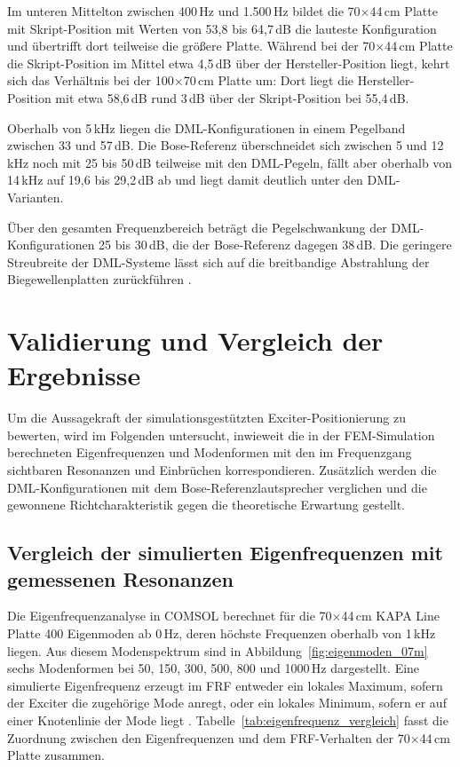 Im unteren Mittelton zwischen 400\,Hz und 1.500\,Hz bildet die 70$\times$44\,cm Platte mit Skript-Position mit Werten von 53,8 bis 64,7\,dB die lauteste Konfiguration und übertrifft dort teilweise die größere Platte. Während bei der 70$\times$44\,cm Platte die Skript-Position im Mittel etwa 4,5\,dB über der Hersteller-Position liegt, kehrt sich das Verhältnis bei der 100$\times$70\,cm Platte um: Dort liegt die Hersteller-Position mit etwa 58,6\,dB rund 3\,dB über der Skript-Position bei 55,4\,dB.

Oberhalb von 5\,kHz liegen die DML-Konfigurationen in einem Pegelband zwischen 33 und 57\,dB. Die Bose-Referenz überschneidet sich zwischen 5 und 12\,kHz noch mit 25 bis 50\,dB teilweise mit den DML-Pegeln, fällt aber oberhalb von 14\,kHz auf 19,6 bis 29,2\,dB ab und liegt damit deutlich unter den DML-Varianten.

Über den gesamten Frequenzbereich beträgt die Pegelschwankung der DML-Konfigurationen 25 bis 30\,dB, die der Bose-Referenz dagegen 38\,dB. Die geringere Streubreite der DML-Systeme lässt sich auf die breitbandige Abstrahlung der Biegewellenplatten zurückführen \cite{Harris2000,Bai2001}.

\clearpage

\section{Validierung und Vergleich der Ergebnisse}

Um die Aussagekraft der simulationsgestützten Exciter-Positionierung zu bewerten, wird im Folgenden untersucht, inwieweit die in der FEM-Simulation berechneten Eigenfrequenzen und Modenformen mit den im Frequenzgang sichtbaren Resonanzen und Einbrüchen korrespondieren. Zusätzlich werden die DML-Konfigurationen mit dem Bose-Referenzlautsprecher verglichen und die gewonnene Richtcharakteristik gegen die theoretische Erwartung gestellt.

\subsection{Vergleich der simulierten Eigenfrequenzen mit gemessenen Resonanzen}

Die Eigenfrequenzanalyse in COMSOL berechnet für die 70$\times$44\,cm KAPA Line Platte 400 Eigenmoden ab 0\,Hz, deren höchste Frequenzen oberhalb von 1\,kHz liegen. Aus diesem Modenspektrum sind in Abbildung~\ref{fig:eigenmoden_07m} sechs Modenformen bei 50, 150, 300, 500, 800 und 1000\,Hz dargestellt. Eine simulierte Eigenfrequenz erzeugt im FRF entweder ein lokales Maximum, sofern der Exciter die zugehörige Mode anregt, oder ein lokales Minimum, sofern er auf einer Knotenlinie der Mode liegt \cite{Cremer1996}. Tabelle~\ref{tab:eigenfrequenz_vergleich} fasst die Zuordnung zwischen den Eigenfrequenzen und dem FRF-Verhalten der 70$\times$44\,cm Platte zusammen.

